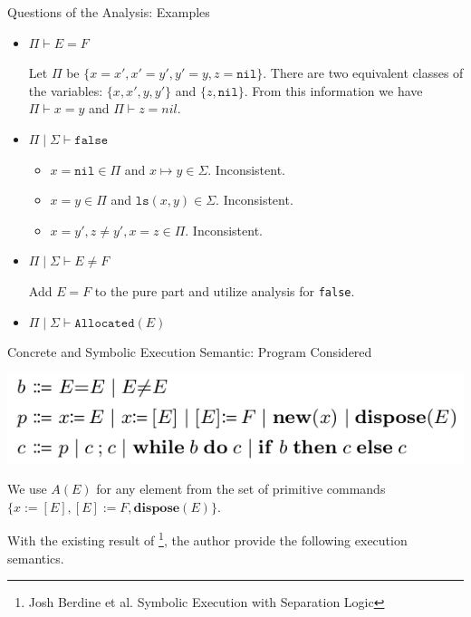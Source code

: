 \documentclass[aspectratio=1610, 13pt]{beamer}
\begin{document}
\begin{frame}{Questions of the Analysis: Examples}
\begin{example}
    \begin{itemize}
        \item $\Pi\vdash E = F$
        
        Let $\Pi$ be $\{x = x', x' = y', y' = y, z = \texttt{nil}\}$. There are two equivalent classes of the variables: $\{x, x', y, y'\}$ and $\{z, \texttt{nil}\}$. From this information we have $\Pi\vdash x = y$ and $\Pi\vdash z = nil$.
        
        
        
        \item $\Pi\mid \Sigma \vdash \texttt{false}$
        \begin{itemize}
            \item $x = \texttt{nil}\in \Pi$ and $x\mapsto y\in \Sigma$. Inconsistent.
            \item $x = y \in \Pi $ and $\texttt{ls}(x,y)\in \Sigma$. Inconsistent.
            \item $x = y', z\ne y', x = z\in \Pi$. Inconsistent.
        \end{itemize}
        \item $\Pi\mid \Sigma \vdash E\ne F $
        
        Add $E = F$ to the pure part and utilize analysis for \texttt{false}.
        
        \item $\Pi\mid \Sigma \vdash \texttt{Allocated}(E)$
    \end{itemize}
\end{example}
    
\end{frame}
\begin{frame}{Concrete and Symbolic Execution Semantic: Program Considered}
    \begin{center}
        \includegraphics[scale=0.45]{program.png}
    \end{center}
    We use $A(E)$ for any element from the set of primitive commands $\{x:=[E], [E]:=F, \mathbf{dispose}(E)\}$.
    
    With the existing result of \footnote{Josh Berdine et al. Symbolic Execution with Separation Logic}, the author provide the following execution semantics.
\end{frame}
\end{document}
